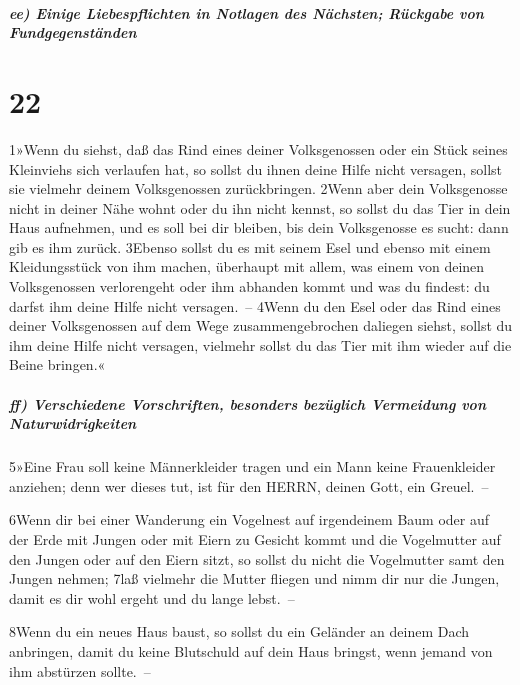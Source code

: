\hypertarget{ee-einige-liebespflichten-in-notlagen-des-nuxe4chsten-ruxfcckgabe-von-fundgegenstuxe4nden}{%
\subparagraph{ee) Einige Liebespflichten in Notlagen des Nächsten;
Rückgabe von
Fundgegenständen}\label{ee-einige-liebespflichten-in-notlagen-des-nuxe4chsten-ruxfcckgabe-von-fundgegenstuxe4nden}}

\hypertarget{section-21}{%
\section{22}\label{section-21}}

1»Wenn du siehst, daß das Rind eines deiner Volksgenossen oder ein Stück
seines Kleinviehs sich verlaufen hat, so sollst du ihnen deine Hilfe
nicht versagen, sollst sie vielmehr deinem Volksgenossen zurückbringen.
2Wenn aber dein Volksgenosse nicht in deiner Nähe wohnt oder du ihn
nicht kennst, so sollst du das Tier in dein Haus aufnehmen, und es soll
bei dir bleiben, bis dein Volksgenosse es sucht: dann gib es ihm zurück.
3Ebenso sollst du es mit seinem Esel und ebenso mit einem Kleidungsstück
von ihm machen, überhaupt mit allem, was einem von deinen Volksgenossen
verlorengeht oder ihm abhanden kommt und was du findest: du darfst ihm
deine Hilfe nicht versagen.~-- 4Wenn du den Esel oder das Rind eines
deiner Volksgenossen auf dem Wege zusammengebrochen daliegen siehst,
sollst du ihm deine Hilfe nicht versagen, vielmehr sollst du das Tier
mit ihm wieder auf die Beine bringen.«

\hypertarget{ff-verschiedene-vorschriften-besonders-bezuxfcglich-vermeidung-von-naturwidrigkeiten}{%
\subparagraph{ff) Verschiedene Vorschriften, besonders bezüglich
Vermeidung von
Naturwidrigkeiten}\label{ff-verschiedene-vorschriften-besonders-bezuxfcglich-vermeidung-von-naturwidrigkeiten}}

5»Eine Frau soll keine Männerkleider tragen und ein Mann keine
Frauenkleider anziehen; denn wer dieses tut, ist für den HERRN, deinen
Gott, ein Greuel.~--

6Wenn dir bei einer Wanderung ein Vogelnest auf irgendeinem Baum oder
auf der Erde mit Jungen oder mit Eiern zu Gesicht kommt und die
Vogelmutter auf den Jungen oder auf den Eiern sitzt, so sollst du nicht
die Vogelmutter samt den Jungen nehmen; 7laß vielmehr die Mutter fliegen
und nimm dir nur die Jungen, damit es dir wohl ergeht und du lange
lebst.~--

8Wenn du ein neues Haus baust, so sollst du ein Geländer an deinem Dach
anbringen, damit du keine Blutschuld auf dein Haus bringst, wenn jemand
von ihm abstürzen sollte.~--

